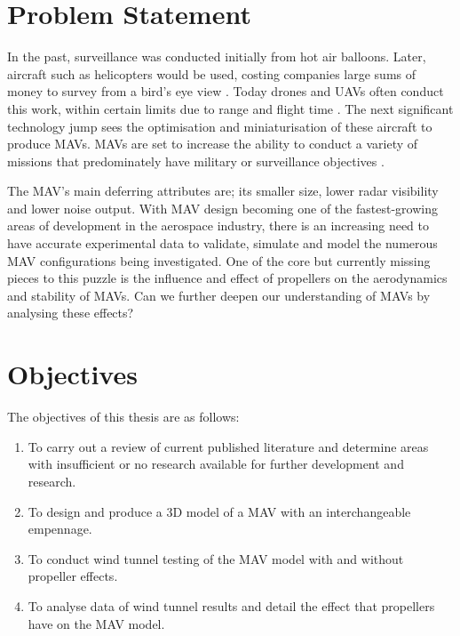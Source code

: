 % 





\section{Problem Statement}
\label{ProblemStatement}

In the past, surveillance was conducted initially from hot air balloons. Later, aircraft such as helicopters would be used, costing companies large sums of money to survey from a bird's eye view \cite{Aleksander2018}. Today drones and UAVs often conduct this work, within certain limits due to range and flight time \cite{NONAMI2007} \cite{Aleksander2018}. The next significant technology jump sees the optimisation and miniaturisation of these aircraft to produce MAVs. MAVs are set to increase the ability to conduct a variety of missions that predominately have military or surveillance objectives \cite{Aleksander2018} \cite{Mil2022} \cite{Greenwood2019} \cite{Saytov2022}. 

The MAV's main deferring attributes are; its smaller size, lower radar visibility and lower noise output. With MAV design becoming one of the fastest-growing areas of development in the aerospace industry, there is an increasing need to have accurate experimental data to validate, simulate and model the numerous MAV configurations being investigated. One of the core but currently missing pieces to this puzzle is the influence and effect of propellers on the aerodynamics and stability of MAVs. Can we further deepen our understanding of MAVs by analysing these effects?




\section{Objectives}
\label{sec:Objectives}
The objectives of this thesis are as follows:

\begin{enumerate}
  \item To carry out a review of current published literature and determine areas with insufficient or no research available for further development and research.
  \item To design and produce a 3D model of a MAV with an interchangeable empennage.
  \item To conduct wind tunnel testing of the MAV model with and without propeller effects.
  \item To analyse data of wind tunnel results and detail the effect that propellers have on the MAV model.
\end{enumerate}


